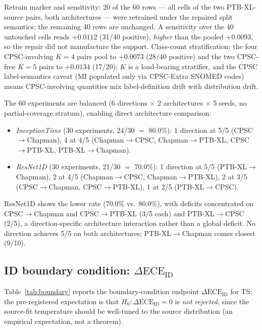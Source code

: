 \documentclass[final,5p,times,nonatbib]{elsarticle}
\begin{document}
Retrain marker and sensitivity: 20 of the 60 rows --- all cells of the
two PTB-XL-source pairs, both architectures --- were retrained under
the repaired split semantics; the remaining 40 rows are unchanged. A
sensitivity over the 40 untouched cells reads $+0.0112$ (31/40
positive), \emph{higher} than the pooled $+0.0093$, so the repair did
not manufacture the support. Class-count stratification: the four
CPSC-involving $K{=}4$ pairs pool to $+0.0073$ (28/40 positive) and the
two CPSC-free $K{=}5$ pairs to $+0.0134$ (17/20); $K$ is a load-bearing
stratifier, and the CPSC label-semantics caveat (MI populated only via
CPSC-Extra SNOMED codes) means CPSC-involving quantities mix
label-definition drift with distribution drift.

The 60 experiments are
balanced (6 directions $\times$ 2 architectures $\times$ 5 seeds, no
partial-coverage stratum), enabling direct architecture comparison:
\begin{itemize}
    \item \emph{InceptionTime} (30 experiments, 24/30 $=$ 80.0\%):
    1 direction at 5/5 (CPSC$\rightarrow$Chapman), 4 at 4/5
    (Chapman$\rightarrow$CPSC, Chapman$\rightarrow$PTB-XL,
    CPSC$\rightarrow$PTB-XL, PTB-XL$\rightarrow$Chapman).
    \item \emph{ResNet1D} (30 experiments, 21/30 $=$ 70.0\%):
    1 direction at 5/5 (PTB-XL$\rightarrow$Chapman),
    2 at 4/5 (Chapman$\rightarrow$CPSC,
    Chapman$\rightarrow$PTB-XL), 2 at 3/5 (CPSC$\rightarrow$Chapman,
    CPSC$\rightarrow$PTB-XL), 1 at 2/5 (PTB-XL$\rightarrow$CPSC).
\end{itemize}
ResNet1D shows the lower rate (70.0\% vs.\ 80.0\%), with deficits
concentrated on CPSC$\rightarrow$Chapman and CPSC$\rightarrow$PTB-XL
(3/5 each) and PTB-XL$\rightarrow$CPSC (2/5), a direction-specific
architecture interaction rather than a global deficit. No direction
achieves 5/5 on both architectures; PTB-XL$\rightarrow$Chapman comes
closest (9/10).

\subsection{ID boundary condition: $\Delta\text{ECE}_{\text{ID}}$}
\label{sec:boundary}
Table~\ref{tab:boundary} reports the boundary-condition endpoint
$\Delta\text{ECE}_{\text{ID}}$ for TS; the pre-registered expectation is
that $H_0:\Delta\text{ECE}_{\text{ID}}=0$ is \emph{not rejected}, since
the source-fit temperature should be well-tuned to the source
distribution (an empirical expectation, not a theorem).
\end{document}
